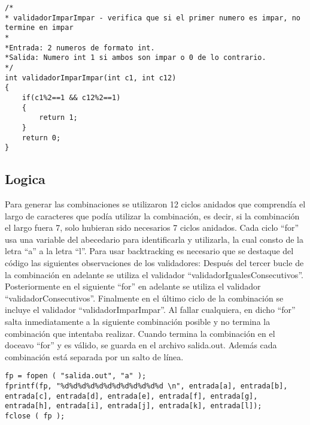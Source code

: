 \documentclass[9pt,twocolumn,twoside]{optica}
\begin{document}
\lstset{language=C, breaklines=true, basicstyle=\footnotesize}
\begin{lstlisting}[frame=single]
/*
* validadorImparImpar - verifica que si el primer numero es impar, no termine en impar
*
*Entrada: 2 numeros de formato int.
*Salida: Numero int 1 si ambos son impar o 0 de lo contrario.
*/
int validadorImparImpar(int c1, int c12)
{
    if(c1%2==1 && c12%2==1)
    {
        return 1;
    }
    return 0;
}
\end{lstlisting}

\subsection{Logica}

Para generar las combinaciones se utilizaron 12 ciclos anidados que comprendía el largo de caracteres que podía utilizar la combinación, es decir, si la combinación el largo fuera 7, solo hubieran sido necesarios 7 ciclos anidados. Cada ciclo “for” usa una variable del abecedario para identificarla y utilizarla, la cual consto de la letra “a” a la letra “l”.
Para usar backtracking es necesario que se destaque del código las siguientes observaciones de los validadores:
Después del tercer bucle de la combinación  en adelante se utiliza el validador “validadorIgualesConsecutivos”.
Posteriormente en el siguiente “for” en adelante se utiliza el validador “validadorConsecutivos”.
Finalmente en el último ciclo de la combinación se incluye el validador “validadorImparImpar”.
Al fallar cualquiera, en dicho “for” salta inmediatamente a la siguiente combinación posible y no termina la combinación que intentaba realizar.
Cuando termina la combinación en el doceavo “for” y es válido, se guarda en el archivo salida.out. Además cada combinación está separada por un salto de línea.


\lstset{language=C, breaklines=true, basicstyle=\footnotesize}
\begin{lstlisting}[frame=single]
fp = fopen ( "salida.out", "a" );
fprintf(fp, "%d%d%d%d%d%d%d%d%d%d%d%d \n", entrada[a], entrada[b], entrada[c], entrada[d], entrada[e], entrada[f], entrada[g], entrada[h], entrada[i], entrada[j], entrada[k], entrada[l]);
fclose ( fp );
\end{lstlisting}
\end{document}
